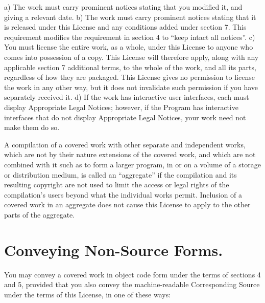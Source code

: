     a) The work must carry prominent notices stating that you modified it, and giving a relevant date.
    b) The work must carry prominent notices stating that it is released under this License and any conditions added under section 7. This requirement modifies the requirement in section 4 to “keep intact all notices”.
    c) You must license the entire work, as a whole, under this License to anyone who comes into possession of a copy. This License will therefore apply, along with any applicable section 7 additional terms, to the whole of the work, and all its parts, regardless of how they are packaged. This License gives no permission to license the work in any other way, but it does not invalidate such permission if you have separately received it.
    d) If the work has interactive user interfaces, each must display Appropriate Legal Notices; however, if the Program has interactive interfaces that do not display Appropriate Legal Notices, your work need not make them do so.

A compilation of a covered work with other separate and independent works, which are not by their nature extensions of the covered work, and which are not combined with it such as to form a larger program, in or on a volume of a storage or distribution medium, is called an “aggregate” if the compilation and its resulting copyright are not used to limit the access or legal rights of the compilation's users beyond what the individual works permit. Inclusion of a covered work in an aggregate does not cause this License to apply to the other parts of the aggregate.
\section{Conveying Non-Source Forms.}

You may convey a covered work in object code form under the terms of sections 4 and 5, provided that you also convey the machine-readable Corresponding Source under the terms of this License, in one of these ways:

